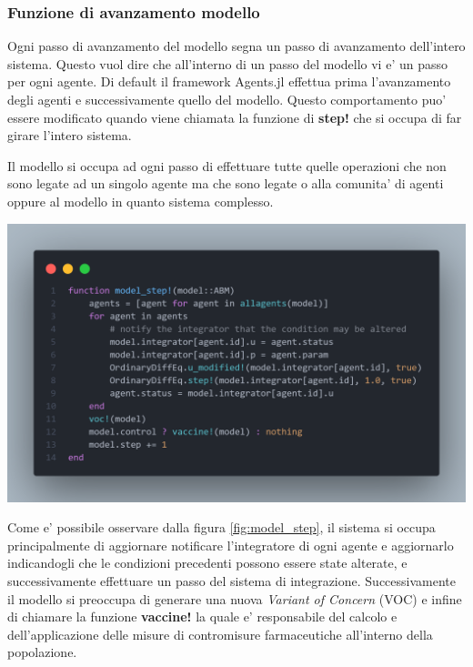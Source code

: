 \subsubsection*{Funzione di avanzamento modello}
Ogni passo di avanzamento del modello segna un passo di avanzamento dell'intero sistema. 
Questo vuol dire che all'interno di un passo del modello vi e' un passo per ogni agente. Di default
il framework Agents.jl effettua prima l'avanzamento degli agenti e successivamente quello del modello.
Questo comportamento puo' essere modificato quando viene chiamata la funzione di \textbf{step!} che 
si occupa di far girare l'intero sistema.

Il modello si occupa ad ogni passo di effettuare tutte quelle operazioni che non sono legate ad un
singolo agente ma che sono legate o alla comunita' di agenti oppure al modello in quanto sistema complesso. 

\begin{minipage}{\linewidth}
	\centering
	\includegraphics[width=\textwidth]{img/model_step.png}
	\label{fig:model_step}
\end{minipage}

Come e' possibile osservare dalla figura \ref{fig:model_step}, il sistema si occupa principalmente
di aggiornare notificare l'integratore di ogni agente e aggiornarlo indicandogli che le condizioni
precedenti possono essere state alterate, e successivamente effettuare un passo del sistema di 
integrazione. Successivamente il modello si preoccupa di generare una nuova \emph{Variant of Concern} (VOC)
e infine di chiamare la funzione \textbf{vaccine!} la quale e' responsabile del calcolo e dell'applicazione 
delle misure di contromisure farmaceutiche all'interno della popolazione. 

